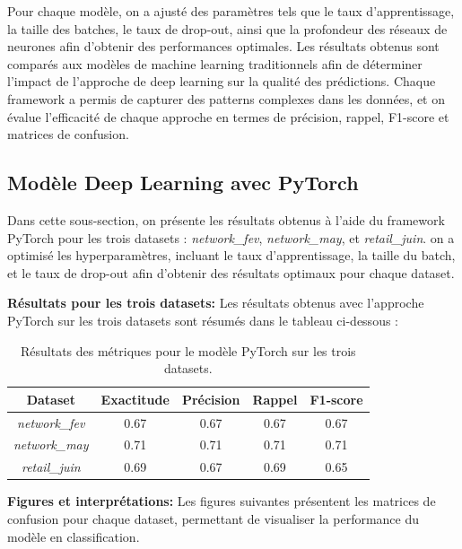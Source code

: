 Pour chaque modèle, on a ajusté des paramètres tels que le taux d'apprentissage, la taille des batches, le taux de drop-out, ainsi que la profondeur des réseaux de neurones afin d'obtenir des performances optimales. Les résultats obtenus sont comparés aux modèles de machine learning traditionnels afin de déterminer l'impact de l'approche de deep learning sur la qualité des prédictions. Chaque framework a permis de capturer des patterns complexes dans les données, et on évalue l'efficacité de chaque approche en termes de précision, rappel, F1-score et matrices de confusion.


\subsection{Modèle Deep Learning avec PyTorch}

Dans cette sous-section, on présente les résultats obtenus à l'aide du framework PyTorch pour les trois datasets : \textit{network\_fev}, \textit{network\_may}, et \textit{retail\_juin}. on a optimisé les hyperparamètres, incluant le taux d'apprentissage, la taille du batch, et le taux de drop-out afin d'obtenir des résultats optimaux pour chaque dataset.

\textbf{Résultats pour les trois datasets:} Les résultats obtenus avec l'approche PyTorch sur les trois datasets sont résumés dans le tableau ci-dessous :

\begin{table}[H]
    \centering
    \begin{tabular}{|c|c|c|c|c|}
        \hline
        \textbf{Dataset} & \textbf{Exactitude} & \textbf{Précision} & \textbf{Rappel} & \textbf{F1-score} \\
        \hline
        \textit{network\_fev} & 0.67 & 0.67 & 0.67 & 0.67 \\
        \textit{network\_may} & 0.71 & 0.71 & 0.71 & 0.71 \\
        \textit{retail\_juin} & 0.69 & 0.67 & 0.69 & 0.65 \\
        \hline
    \end{tabular}
    \caption{Résultats des métriques pour le modèle PyTorch sur les trois datasets.}
\end{table}

\textbf{Figures et interprétations:} Les figures suivantes présentent les matrices de confusion pour chaque dataset, permettant de visualiser la performance du modèle en classification.

